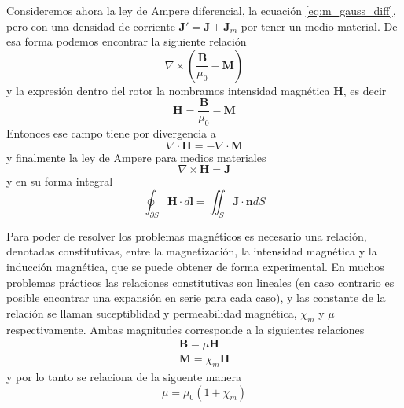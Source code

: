 \documentclass[11pt,a4paper]{article}
\numberwithin{equation}{section}
\begin{document}
Consideremos ahora la ley de Ampere diferencial, la ecuación \ref{eq:m_gauss_diff}, pero con una densidad de corriente $\textbf{J}' = \textbf{J} + \textbf{J}_{m}$ por tener un medio material. De esa forma podemos encontrar la siguiente relación \[\nabla \times \left(\frac{\textbf{B}}{\mu_0} - \textbf{M}\right)\] y la expresión dentro del rotor la nombramos intensidad magnética $\textbf{H}$, es decir
\begin{equation}
    \textbf{H} = \frac{\textbf{B}}{\mu_0} - \textbf{M}
    \label{eq:m_intensidad_magnetica}
\end{equation}
Entonces ese campo tiene por divergencia a
\begin{equation}
    \nabla \cdot \textbf{H} = - \nabla \cdot \textbf{M}
    \label{eq:m_intensidad_magnetica_divergencia}
\end{equation}
y finalmente la ley de Ampere para medios materiales
\begin{equation}
    \nabla \times \textbf{H} = \textbf{J}
    \label{eq:m_ampere_dif_materia}
\end{equation}
y en su forma integral
\begin{equation}
    \oint_{\partial S} \textbf{H} \cdot d\textbf{l} = \iint_{S} \textbf{J} \cdot \textbf{n} dS
    \label{eq:m_ampere_int_materia}
\end{equation}

Para poder de resolver los problemas magnéticos es necesario una relación, denotadas constitutivas, entre la magnetización, la intensidad magnética y la inducción magnética, que se puede obtener de forma experimental. En muchos problemas prácticos las relaciones constitutivas son lineales (en caso contrario es posible encontrar una expansión en serie para cada caso), y las constante de la relación se llaman suceptiblidad y permeabilidad magnética, $\chi_m$ y $\mu$ respectivamente. Ambas magnitudes corresponde a la siguientes relaciones
\begin{align}
    \textbf{B} = \mu \textbf{H}\\
    \textbf{M} = \chi_m \textbf{H}
    \label{eq:m_relaciones_constitutivas}
\end{align}
y por lo tanto se relaciona de la siguente manera
\begin{equation}
    \mu = \mu_0(1 + \chi_m)
    \label{eq:m_permeabilidad_suceptibilidad}
\end{equation}
\end{document}
